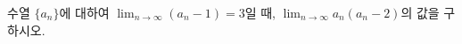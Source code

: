 수열 $\{a_n\}$에 대하여 $\displaystyle\lim_{n\to\infty}(a_n-1)=3$일 때, $\displaystyle\lim_{n\to\infty}a_n(a_n-2)$의 값을 구하시오.
